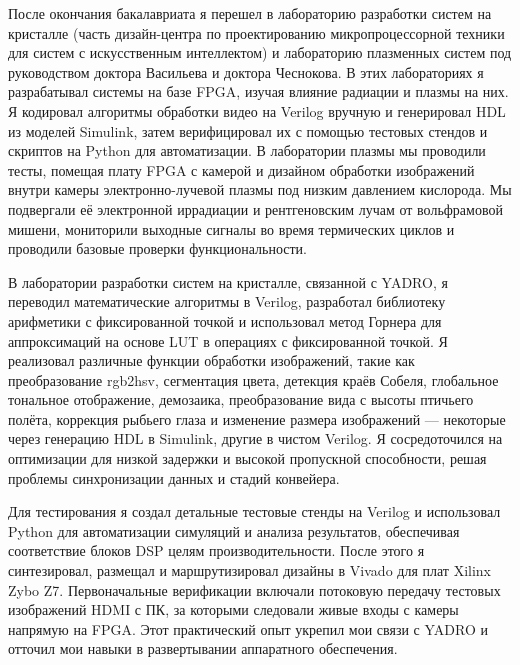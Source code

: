 \documentclass[a4paper,11pt]{article}
\begin{document}
\vspace{10pt}

После окончания бакалавриата я перешел в лабораторию разработки систем на кристалле (часть дизайн-центра по проектированию микропроцессорной техники для систем с искусственным интеллектом) и лабораторию плазменных систем под руководством доктора Васильева и доктора Чеснокова. В этих лабораториях я разрабатывал системы на базе FPGA, изучая влияние радиации и плазмы на них. Я кодировал алгоритмы обработки видео на Verilog вручную и генерировал HDL из моделей Simulink, затем верифицировал их с помощью тестовых стендов и скриптов на Python для автоматизации. В лаборатории плазмы мы проводили тесты, помещая плату FPGA с камерой и дизайном обработки изображений внутри камеры электронно-лучевой плазмы под низким давлением кислорода. Мы подвергали её электронной иррадиации и рентгеновским лучам от вольфрамовой мишени, мониторили выходные сигналы во время термических циклов и проводили базовые проверки функциональности.

\vspace{10pt}

В лаборатории разработки систем на кристалле, связанной с YADRO\footnotemark[2], я переводил математические алгоритмы в Verilog, разработал библиотеку арифметики с фиксированной точкой и использовал метод Горнера для аппроксимаций на основе LUT в операциях с фиксированной точкой. Я реализовал различные функции обработки изображений, такие как преобразование rgb2hsv, сегментация цвета, детекция краёв Собеля, глобальное тональное отображение, демозаика, преобразование вида с высоты птичьего полёта, коррекция рыбьего глаза и изменение размера изображений — некоторые через генерацию HDL в Simulink, другие в чистом Verilog. Я сосредоточился на оптимизации для низкой задержки и высокой пропускной способности, решая проблемы синхронизации данных и стадий конвейера.

\vspace{10pt}

Для тестирования я создал детальные тестовые стенды на Verilog и использовал Python для автоматизации симуляций и анализа результатов, обеспечивая соответствие блоков DSP целям производительности. После этого я синтезировал, размещал и маршрутизировал дизайны в Vivado для плат Xilinx Zybo Z7. Первоначальные верификации включали потоковую передачу тестовых изображений HDMI с ПК, за которыми следовали живые входы с камеры напрямую на FPGA. Этот практический опыт укрепил мои связи с YADRO и отточил мои навыки в развертывании аппаратного обеспечения.
\end{document}
